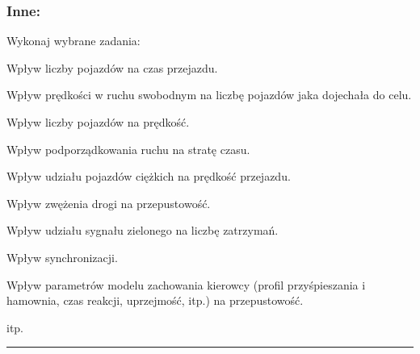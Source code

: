 \documentclass[11pt,a4paper]{article}
\begin{document}
\subsubsection{Inne:} 






Wykonaj wybrane zadania:
\begin{compactenum}
\item Wpływ liczby pojazdów na czas przejazdu.
\item Wpływ prędkości w ruchu swobodnym na liczbę pojazdów jaka dojechała do celu.
\item Wpływ liczby pojazdów na prędkość.
\item Wpływ podporządkowania ruchu na stratę czasu.
\item Wpływ udziału pojazdów ciężkich na prędkość przejazdu.
\item Wpływ zwężenia drogi na przepustowość.
\item Wpływ udziału sygnału zielonego na liczbę zatrzymań.
\item Wpływ synchronizacji.
\item Wpływ parametrów modelu zachowania kierowcy (profil przyśpieszania i hamownia, czas reakcji, uprzejmość, itp.) na przepustowość.
\item itp.
\end{compactenum}



\begin{center}
\end{center}

\noindent\rule{16.9cm}{1pt}
\end{document}
